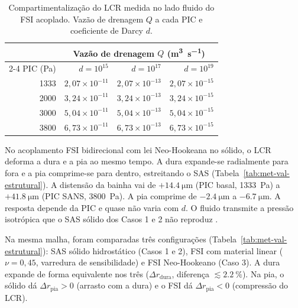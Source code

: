 \documentclass[article, hidelinks,oneside,12pt]{abntex2}
\begin{document}
\begin{table}[h!]
\centering
\small
\caption{Compartimentalização do LCR medida no lado fluido do FSI acoplado. Vazão de drenagem $Q$ a cada PIC e coeficiente de Darcy $d$.}
\label{tab:res-caso1-grid}
\begin{tabular}{r r r r}
\toprule
& \multicolumn{3}{c}{Vazão de drenagem $Q$ (\si{\meter\cubed\per\second})} \\
\cmidrule(lr){2-4}
PIC (\si{\pascal}) & $d = 10^{15}$ & $d = 10^{17}$ & $d = 10^{19}$ \\
\midrule
1333 & $2{,}07\times10^{-11}$ & $2{,}07\times10^{-13}$ & $2{,}07\times10^{-15}$ \\
2000 & $3{,}24\times10^{-11}$ & $3{,}24\times10^{-13}$ & $3{,}24\times10^{-15}$ \\
3000 & $5{,}04\times10^{-11}$ & $5{,}04\times10^{-13}$ & $5{,}04\times10^{-15}$ \\
3800 & $6{,}73\times10^{-11}$ & $6{,}73\times10^{-13}$ & $6{,}73\times10^{-15}$ \\
\bottomrule
\end{tabular}
\end{table}

No acoplamento FSI bidirecional com lei Neo-Hookeana no sólido, o LCR deforma a dura e a pia ao mesmo tempo. A dura expande-se radialmente para fora e a pia comprime-se para dentro, estreitando o SAS (Tabela~\ref{tab:met-val-estrutural}). A distensão da bainha vai de $+\SI{14.4}{\micro\meter}$ (PIC basal, \SI{1333}{\pascal}) a $+\SI{41.8}{\micro\meter}$ (PIC SANS, \SI{3800}{\pascal}). A pia comprime de $-\SI{2.4}{\micro\meter}$ a $-\SI{6.7}{\micro\meter}$. A resposta depende da PIC e quase não varia com $d$. O fluido transmite a pressão isotrópica que o SAS sólido dos Casos 1 e 2 não reproduz \cite{lee2020, furlani}.

Na mesma malha, foram comparadas três configurações (Tabela~\ref{tab:met-val-estrutural}): SAS sólido hidrostático (Casos 1 e 2), FSI com material linear ($\nu = 0{,}45$, varredura de sensibilidade) e FSI Neo-Hookeano (Caso 3). A dura expande de forma equivalente nos três ($\Delta r_{\mathrm{dura}}$, diferença $\lesssim \SI{2.2}{\percent}$). Na pia, o sólido dá $\Delta r_{\mathrm{pia}} > 0$ (arrasto com a dura) e o FSI dá $\Delta r_{\mathrm{pia}} < 0$ (compressão do LCR).
\end{document}
